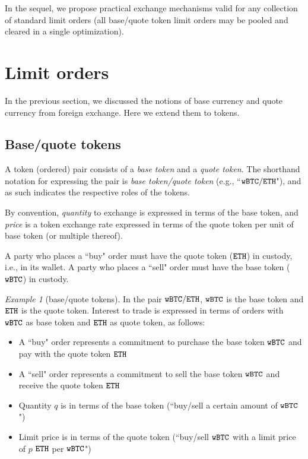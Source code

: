 \documentclass[11pt, reqno]{amsart}
\theoremstyle{definition}
\theoremstyle{remark}
\newtheorem{exmp}{Example}[subsection]
\newcommand{\BTC}{\textnormal{\texttt{wBTC}}}
\newcommand{\ETH}{\textnormal{\texttt{ETH}}}
\begin{document}
In the sequel, we propose practical exchange mechanisms valid for any collection
of standard limit orders (all base/quote token limit orders may be pooled and
cleared in a single optimization).

\section{Limit orders}
In the previous section, we discussed the notions of base currency and
quote currency from foreign exchange. Here we extend them to tokens.

\subsection{Base/quote tokens}
A token (ordered) pair consists of a \emph{base token} and a
\emph{quote token}. The shorthand notation for expressing the pair is
\emph{base token/quote token} (e.g., ``$\BTC/\ETH$"), and as such indicates the
respective roles of the tokens.

By convention, \emph{quantity} to exchange is expressed in terms of the base
token, and \emph{price} is a token exchange rate expressed in terms of the
quote token per unit of base token (or multiple thereof).

A party who places a ``buy" order must have the quote token ($\ETH$) in custody,
i.e., in its wallet. A party who places a ``sell" order must have the base
token ($\BTC$) in custody.

\begin{exmp}[base/quote tokens]
In the pair $\BTC/\ETH$, $\BTC$ is the base token and $\ETH$
is the quote token. Interest to trade is expressed in terms of orders
with $\BTC$ as base token and $\ETH$ as quote token, as follows:
\begin{itemize}
    \item A ``buy" order represents a commitment to purchase the base token
          $\BTC$ and pay with the quote token $\ETH$
    \item A ``sell" order represents a commitment to sell the base token
          $\BTC$ and receive the quote token $\ETH$
    \item Quantity $q$ is in terms of the base token (``buy/sell a certain
          amount of $\BTC$")
    \item Limit price is in terms of the quote token (``buy/sell $\BTC$ with a
          limit price of $p$ $\ETH$ per $\BTC$")
\end{itemize}
\end{exmp}
\end{document}
